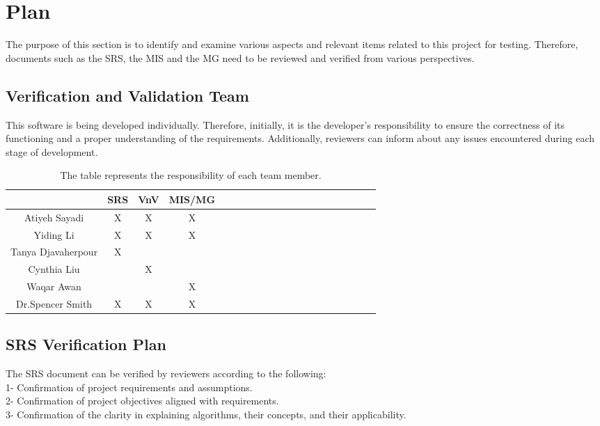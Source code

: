\documentclass[12pt, titlepage]{article}
\begin{document}
\section{Plan}
The purpose of this section is to identify and examine various aspects and relevant items related to this project for testing. Therefore, documents such as the SRS, the  MIS and the MG need to be reviewed and verified from various perspectives.

\subsection{Verification and Validation Team}

This software is being developed individually. Therefore, initially, it is the developer's responsibility to ensure the correctness of its functioning and a proper understanding of the requirements. Additionally, reviewers can inform about any issues encountered during each stage of development.


\begin{table}[h!]
\centering
\begin{tabular}{|c|c|c|c|c|c|c|c|c|c|c|c|c|c|c|c|c|c|c|c|}
\hline
	& \textbf{SRS }& \textbf{VnV}& \textbf{MIS/MG} \\
\hline
Atiyeh Sayadi& X& X& X \\ \hline
Yiding Li & X& X& X \\ \hline
Tanya Djavaherpour& X& & \\ \hline
Cynthia Liu& & X& \\ \hline
Waqar Awan& & & X \\ \hline
Dr.Spencer Smith& X& X& X \\ \hline
\end{tabular}
\caption{The table represents the responsibility of each team member. }
\label{Table:2}
\end{table}

\subsection{SRS Verification Plan}

The SRS document can be verified by reviewers according to the following:\\
1- Confirmation of project requirements and assumptions.\\
2- Confirmation of project objectives aligned with requirements.\\
3- Confirmation of the clarity in explaining algorithms, their concepts, and their applicability.\\
\end{document}
